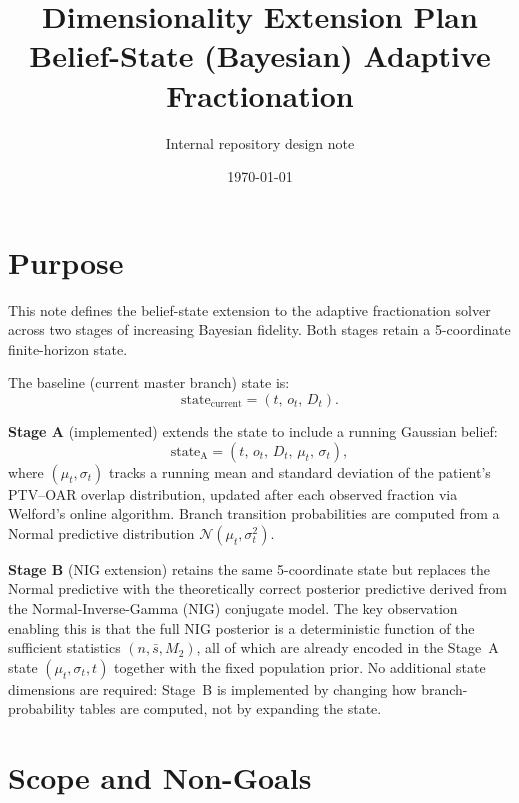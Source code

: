 \documentclass[11pt]{article}
\title{Dimensionality Extension Plan\\Belief-State (Bayesian) Adaptive Fractionation}
\author{Internal repository design note}
\date{\today}
\begin{document}
\maketitle

\section{Purpose}

This note defines the belief-state extension to the adaptive fractionation solver across two stages of increasing Bayesian fidelity. Both stages retain a 5-coordinate finite-horizon state.

The baseline (current master branch) state is:
\begin{equation}
\text{state}_{\mathrm{current}} = (t,\, o_t,\, D_t).
\end{equation}

\textbf{Stage A} (implemented) extends the state to include a running Gaussian belief:
\begin{equation}
\text{state}_{\mathrm{A}} = (t,\, o_t,\, D_t,\, \mu_t,\, \sigma_t),
\end{equation}
where $(\mu_t, \sigma_t)$ tracks a running mean and standard deviation of the patient's PTV--OAR overlap distribution, updated after each observed fraction via Welford's online algorithm. Branch transition probabilities are computed from a Normal predictive distribution $\mathcal{N}(\mu_t, \sigma_t^2)$.

\textbf{Stage B} (NIG extension) retains the same 5-coordinate state but replaces the Normal predictive with the theoretically correct posterior predictive derived from the Normal-Inverse-Gamma (NIG) conjugate model. The key observation enabling this is that the full NIG posterior is a deterministic function of the sufficient statistics $(n, \bar s, M_2)$, all of which are already encoded in the Stage~A state $(\mu_t, \sigma_t, t)$ together with the fixed population prior. No additional state dimensions are required: Stage~B is implemented by changing how branch-probability tables are computed, not by expanding the state.

\section{Scope and Non-Goals}
\end{document}
